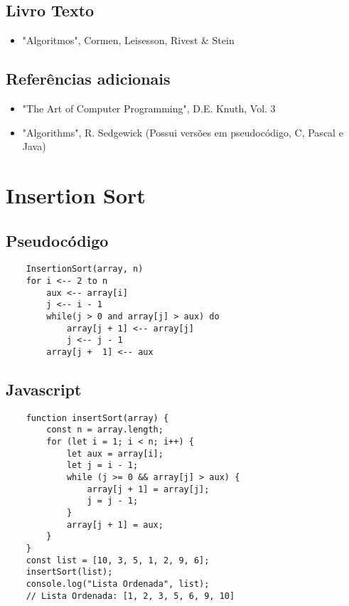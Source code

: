 \documentclass{article}
\begin{document}
\subsection{Livro Texto}


\begin{itemize}
\item \textnormal{"Algoritmos", Cormen, Leisesson, Rivest & Stein}
\end{itemize}

\subsection{Referências adicionais}

\begin{itemize}
\item \textnormal{"The Art of Computer Programming", D.E. Knuth, Vol. 3}
\item \textnormal{"Algorithms", R. Sedgewick (Possui versões em pseudocódigo, C, Pascal e Java)}
\end{itemize}





\section{Insertion Sort}

\subsection{Pseudocódigo}
\begin{lstlisting}
    InsertionSort(array, n)
    for i <-- 2 to n
        aux <-- array[i]
        j <-- i - 1
        while(j > 0 and array[j] > aux) do
            array[j + 1] <-- array[j]
            j <-- j - 1
        array[j +  1] <-- aux
\end{lstlisting}

\subsection{Javascript}

\begin{lstlisting}
    function insertSort(array) {
        const n = array.length;
        for (let i = 1; i < n; i++) {
            let aux = array[i];
            let j = i - 1;
            while (j >= 0 && array[j] > aux) {
                array[j + 1] = array[j];
                j = j - 1;
            }
            array[j + 1] = aux;
        }
    }
    const list = [10, 3, 5, 1, 2, 9, 6];
    insertSort(list);
    console.log("Lista Ordenada", list);
    // Lista Ordenada: [1, 2, 3, 5, 6, 9, 10]

\end{lstlisting}
\end{document}
